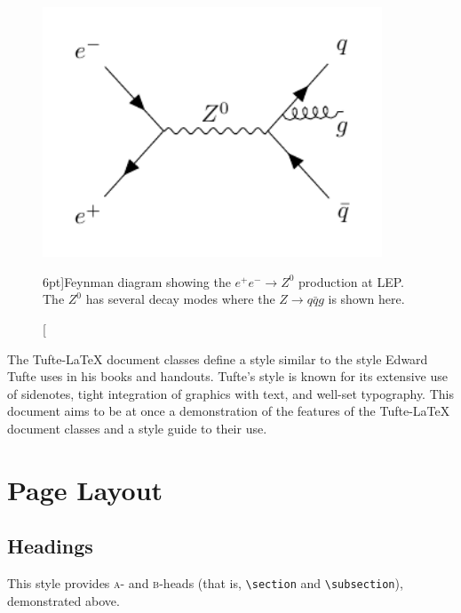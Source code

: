 \documentclass[a4paper, twoside, nobib]{tufte-book}
\newcommand{\TL}{Tufte-\LaTeX\xspace}
\begin{document}
\begin{figure}
  \includegraphics[width=0.9\textwidth]{figures/feynman_diagrams/eeZqqg.pdf}
  \caption[Feynman diagram for the jet production at LEP][6pt]{Feynman diagram showing the $e^+ e^- \rightarrow Z^0$ production at LEP. The $Z^0$ has several decay modes where the $Z \rightarrow q\bar{q}g$ is shown here.}
  \label{fig:hep:feynman_3j_qqg}
\end{figure}






The \TL document classes define a style similar to the
style Edward Tufte uses in his books and handouts.  Tufte's style is known
for its extensive use of sidenotes, tight integration of graphics with
text, and well-set typography.  This document aims to be at once a
demonstration of the features of the \TL document classes
and a style guide to their use.

\section{Page Layout}\label{sec:page-layout}
\subsection{Headings}\label{sec:headings}
This style provides \textsc{a}- and \textsc{b}-heads (that is,
\Verb|\section| and \Verb|\subsection|), demonstrated above.
\end{document}
